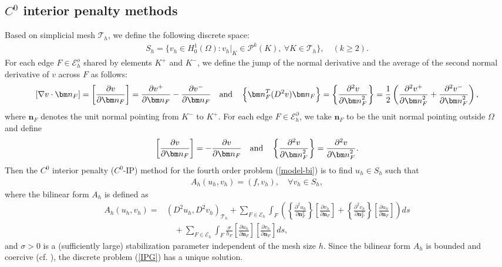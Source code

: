 \documentclass[1996/10/24]{amsart}
\theoremstyle{definition}
\numberwithin{equation}{section}
\begin{document}
\subsection{$C^0$ interior penalty methods}\label{sec4:1}
Based on simplicial mesh $\mathcal{T}_h$, we define the following discrete space:
\begin{align*}
S_h=\{v_h\in H_0^1(\Omega): v_h|_K\in \mathcal{P}^k(K),~\forall K\in\mathcal{T}_h\},\quad (k\geq 2).
\end{align*}
For each edge $F\in\mathcal{E}_h^o$ shared by elements $K^+$ and $K^-$, we define the jump of the normal derivative and the average of the second normal derivative of $v$ across $F$ as follows:
\begin{align*}
\left[\nabla v\cdot{\bm n}_F\right]=\left[\frac{\partial v}{\partial {\bm n}_F}\right]=\frac{\partial v^+}{\partial {\bm n}_F}-\frac{\partial v^-}{\partial {\bm n}_F}\quad {\rm and}\quad \left\{{\bm n}_F^T(D^2v){\bm n}_F\right\}=\left\{\frac{\partial^2 v}{\partial{\bm n}_F^2}\right\}=\frac{1}{2}\left(
\frac{\partial^2 v^+}{\partial {\bm n}_F^2}+\frac{\partial^2 v^-}{\partial{\bm n}_F^2}\right),
\end{align*}
where ${\bm n}_F$ denotes the unit normal pointing from $K^-$ to $K^+$.
For each edge $F\in\mathcal{E}_h^{\partial}$, we take ${\bm n}_F$ to be the unit normal pointing outside $\Omega$ and define
\begin{align*}
\left[\frac{\partial v}{\partial {\bm n}_F}\right]=-\frac{\partial v}{\partial {\bm n}_F}\quad {\rm and}\quad \left\{\frac{\partial^2 v}{\partial{\bm n}_F^2}\right\}=\frac{\partial^2 v}{\partial{\bm n}_F^2}.
\end{align*}
Then the $C^0$ interior penalty ($C^{0}$-IP) method for the fourth order problem (\ref{model-bi}) is to find $u_h\in S_h$ such that
\begin{align}
A_h(u_h,v_h)=(f,v_h),\quad \forall v_h\in S_h,\label{IPG}
\end{align}
where the bilinear form $A_h$ is defined as
\begin{align*}
A_h(u_h,v_h)= & (D^2u_h,D^2v_h)_{\mathcal{T}_h}
+\sum_{F\in\mathcal{E}_h}\int_F \left( \left\{\frac{\partial^2 u_h}{\partial{\bm n}_F^2}\right\}\left[
\frac{\partial v_h}{\partial {\bm n}_F}\right]+\left\{\frac{\partial^2 v_h}{\partial{\bm n}_F^2}\right\}\left[
\frac{\partial u_h}{\partial {\bm n}_F}\right] \right) ds \\
& \quad + \sum_{F\in \mathcal{E}_{h}}\int_{F} \frac{\sigma}{h_F}
\left[\frac{\partial u_h}{\partial {\bm n}_F}\right]\left[\frac{\partial v_h}{\partial {\bm n}_F}\right] ds,
\end{align*}
and $\sigma>0$ is a (sufficiently large) stabilization parameter independent of the mesh size $h$.
Since the bilinear form $A_h$ is bounded and coercive (cf. \cite{bs2005}), the discrete problem (\ref{IPG})
has a unique solution.
\end{document}
